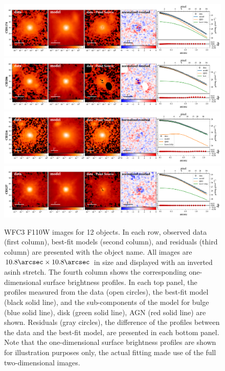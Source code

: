 \documentclass[apj]{emulateapj}
\begin{document}
\begin{figure}
\centering
{
\includegraphics[height=0.25\textwidth]{fig/best_fit_CID1174_SB_profile.pdf}
\includegraphics[height=0.25\textwidth]{fig/best_fit_CID206_SB_profile.pdf}
\includegraphics[height=0.25\textwidth]{fig/best_fit_CID216_SB_profile.pdf}
\includegraphics[height=0.25\textwidth]{fig/best_fit_CID237_SB_profile.pdf}
\caption{\label{fig:ML} WFC3 F110W images for 12 objects. In each row, observed data (first column), best-fit models (second column), and residuals (third column) are presented with the object name. All images are $10.8\arcsec\times10.8\arcsec$ in size and
 displayed with an inverted asinh stretch.
	    The fourth column shows the corresponding one-dimensional surface brightness profiles. In each top panel, the profiles measured from the data (open circles), the best-fit model (black solid line), and the sub-components of the model for bulge (blue solid line), disk (green solid line), AGN (red solid line) are shown. Residuals (gray circles), the difference of the profiles between the data and the best-fit model, are presented in each bottom panel. Note that the one-dimensional surface brightness profiles are shown for illustration purposes only, the actual fitting made use of the full two-dimensional images.}
}
\end{figure} 
\end{document}
